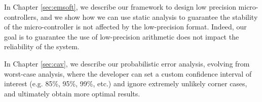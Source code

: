 %
%
%
%
In Chapter \ref{sec:emsoft}, we describe our framework to design low precision micro-controllers, and we show how we can use static analysis to guarantee the stability of the micro-controller is not affected by the low-precision format.
%
Indeed, our goal is to guarantee the use of low-precision arithmetic does not impact the reliability of the system.

%
%

%
%
%
In Chapter \ref{sec:cav}, we describe our probabilistic error analysis, evolving from worst-case analysis, where the developer can set a custom confidence interval of interest (e.g. 85\%, 95\%, 99\%, etc.) and ignore extremely unlikely corner cases, and ultimately obtain more optimal results.
%

\newpage



%
%
%

%
%
